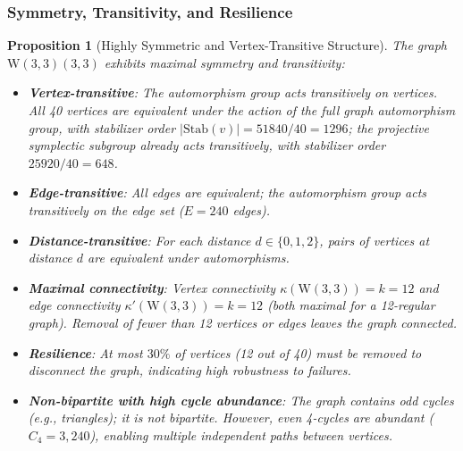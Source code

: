 \documentclass[12pt,a4paper]{article}
\newtheorem{proposition}[theorem]{Proposition}
\newcommand{\W}{\mathrm{W}(3,3)}
\begin{document}
\subsubsection{Symmetry, Transitivity, and Resilience}

\begin{proposition}[Highly Symmetric and Vertex-Transitive Structure]\label{prop:symmetry}
The graph $\W(3,3)$ exhibits maximal symmetry and transitivity:
\begin{itemize}
  \item \textbf{Vertex-transitive}: The automorphism group acts transitively on vertices.
      All 40 vertices are equivalent under the action of the full graph automorphism group,
      with stabilizer order $|\mathrm{Stab}(v)| = 51840/40 = 1296$; the projective symplectic
      subgroup already acts transitively, with stabilizer order $25920/40 = 648$.
  \item \textbf{Edge-transitive}: All edges are equivalent; the automorphism group
        acts transitively on the edge set ($E = 240$ edges).
  \item \textbf{Distance-transitive}: For each distance $d \in \{0,1,2\}$, pairs of vertices
        at distance $d$ are equivalent under automorphisms.
  \item \textbf{Maximal connectivity}: Vertex connectivity $\kappa(\W) = k = 12$ and
        edge connectivity $\kappa'(\W) = k = 12$ (both maximal for a 12-regular graph).
        Removal of fewer than 12 vertices or edges leaves the graph connected.
  \item \textbf{Resilience}: At most $30\%$ of vertices (12 out of 40) must be removed
        to disconnect the graph, indicating high robustness to failures.
  \item \textbf{Non-bipartite with high cycle abundance}: The graph contains odd cycles
        (e.g., triangles); it is not bipartite. However, even 4-cycles are abundant
        ($C_4 = 3,240$), enabling multiple independent paths between vertices.
\end{itemize}
\end{proposition}
\end{document}
